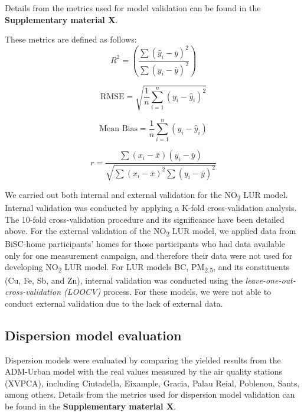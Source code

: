 \documentclass{article}
\begin{document}
Details from the metrics used for model validation can be found in the \textbf{Supplementary material X}.

These metrics are defined as follows:
\begin{equation}
R^2 = \left( \frac{\sum (\hat{y}_i - \bar{y})^2}{\sum (y_i - \bar{y})^2} \right)
\end{equation}

\begin{equation}
\text{RMSE} = \sqrt{\frac{1}{n} \sum_{i=1}^{n} (y_i - \hat{y}_i)^2}
\end{equation}

\begin{equation}
\text{Mean Bias} = \frac{1}{n} \sum_{i=1}^{n} (y_i - \hat{y}_i)
\end{equation}

\begin{equation}
r = \frac{\sum (x_i - \bar{x})(y_i - \bar{y})}{\sqrt{\sum (x_i - \bar{x})^2 \sum (y_i - \bar{y})^2}}
\end{equation}
\vspace{0.5 cm}

We carried out both internal and external validation for the NO\textsubscript{2} LUR model. Internal validation was conducted by applying a K-fold cross-validation analysis. The 10-fold cross-validation procedure and its significance have been detailed above. For the external validation of the NO\textsubscript{2} LUR model, we applied data from BiSC-home participants' homes for those participants who had data available only for one measurement campaign, and therefore their data were not used for developing NO\textsubscript{2} LUR model. For LUR models BC, PM\textsubscript{2.5}, and its constituents (Cu, Fe, Sb, and Zn), internal validation was conducted using the \textit{leave-one-out-cross-validation (LOOCV)} process. For these models, we were not able to conduct external validation due to the lack of external data.

\subsection{Dispersion model evaluation}
Dispersion models were evaluated by comparing the yielded results from the ADM-Urban model with the real values measured by the air quality stations (XVPCA), including Ciutadella, Eixample, Gracia, Palau Reial, Poblenou, Sants, among others. Details from the metrics used for dispersion model validation can be found in the \textbf{Supplementary material X}.\vspace{0.5cm} 
\end{document}
